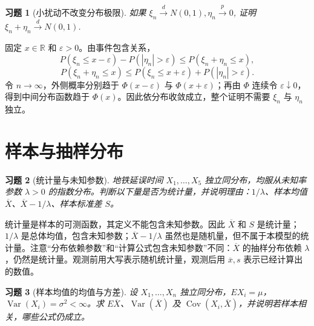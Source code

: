 \documentclass[12pt,fontset=fandol]{ctexart}
\newtheorem{exercise}{习题}[section]
\begin{document}
\begin{exercise}[小扰动不改变分布极限]\label{q:A7.25}
如果 $\xi_n\xrightarrow{d}N(0,1),\eta_n\xrightarrow{p}0$, 证明 $\xi_n+\eta_n\xrightarrow{d}N(0,1)$.\par{}
\end{exercise}

\begin{solve}\label{a:A7.25}固定 $x\in\mathbb R$ 和 $\varepsilon>0$。由事件包含关系，\[P(\xi_n\le x-\varepsilon)-P(|\eta_n|>\varepsilon)\le P(\xi_n+\eta_n\le x),\]\[P(\xi_n+\eta_n\le x)\le P(\xi_n\le x+\varepsilon)+P(|\eta_n|>\varepsilon).\]令 $n\to\infty$，外侧概率分别趋于 $\Phi(x-\varepsilon)$ 与 $\Phi(x+\varepsilon)$；再由 $\Phi$ 连续令 $\varepsilon\downarrow0$，得到中间分布函数趋于 $\Phi(x)$。因此依分布收敛成立，整个证明不需要 $\xi_n$ 与 $\eta_n$ 独立。\end{solve}

\clearpage\section{样本与抽样分布}

\begin{exercise}[统计量与未知参数]\label{q:M-F-C4}
地铁延误时间 $X_1,\ldots,X_5$ 独立同分布，均服从未知率参数 $\lambda>0$ 的指数分布。判断以下量是否为统计量，并说明理由：$1/\lambda$、样本均值 $\overline X$、$\overline X-1/\lambda$、样本标准差 $S$。\par{}
\end{exercise}

\begin{solve}\label{a:M-F-C4}统计量是样本的可测函数，其定义不能包含未知参数。因此 $\overline X$ 和 $S$ 是统计量；$1/\lambda$ 是总体均值，包含未知参数；$\overline X-1/\lambda$ 虽然也是随机量，但不属于本模型的统计量。注意“分布依赖参数”和“计算公式包含未知参数”不同：$\overline X$ 的抽样分布依赖 $\lambda$，仍然是统计量。观测前用大写表示随机统计量，观测后用 $\overline x,s$ 表示已经计算出的数值。\end{solve}

\begin{exercise}[样本均值的均值与方差]\label{q:B8.1}
设 $X_1,\ldots,X_n$ 独立同分布，$EX_i=\mu$，$\operatorname{Var}(X_i)=\sigma^2<\infty$。求 $E\overline X$、$\operatorname{Var}(\overline X)$ 及 $\operatorname{Cov}(X_i,\overline X)$，并说明若样本相关，哪些公式仍成立。\par{}
\end{exercise}
\end{document}

